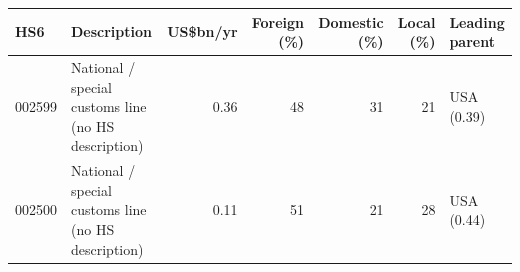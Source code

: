 \begin{tabular}{@{}l p{6.4cm} r r r r l@{}}
\toprule
HS6 & Description & US\$bn/yr & Foreign (\%) & Domestic (\%) & Local (\%) & Leading parent \\
\midrule
002599 & National /\allowbreak{} special customs line (no HS description) & 0.36 & 48 & 31 & 21 & USA (0.39) \\
002500 & National /\allowbreak{} special customs line (no HS description) & 0.11 & 51 & 21 & 28 & USA (0.44) \\
\bottomrule
\end{tabular}
